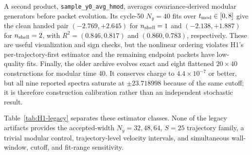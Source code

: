 \documentclass[aps,prx,twocolumn,floatfix,nofootinbib,superscriptaddress,longbibliography]{revtex4-2}
\newcommand{\code}[1]{\texttt{#1}}
\begin{document}
A second product, \code{sample\_y0\_avg\_hmod}, averages covariance-derived modular
generators before packet evolution.  Its cycle-50 $N_y=40$ fits over
$t_{\rm mod}\in[0,8]$ give the clean handed pair $(-2.769,+2.645)$ for
$n_{\rm shell}=1$ and $(-2.138,+1.887)$ for $n_{\rm shell}=2$, with
$R^2=(0.846,0.817)$ and $(0.860,0.783)$, respectively.  These are useful visualization and
sign checks, but the nonlinear ordering violates H1's per-trajectory-first estimator and
the remaining endpoint packets have low-quality fits.  Finally, the older
 archive evolves exact and eight flattened
$20\times40$ constructions for modular time 40.  It conserves charge to
$4.4\times10^{-7}$ or better, but all nine reported spectra saturate at
$\pm23.718998$ because of the same cutoff; it is therefore construction calibration rather
than an independent stochastic result.

Table~\ref{tab:H1-legacy} separates these estimator classes.  None of the legacy artifacts
provides the accepted-width $N_y=32,48,64$, $S=25$ trajectory family, a trivial modular
control, trajectory-level velocity intervals, and simultaneous wall-window, cutoff, and
fit-range sensitivity.
\end{document}
